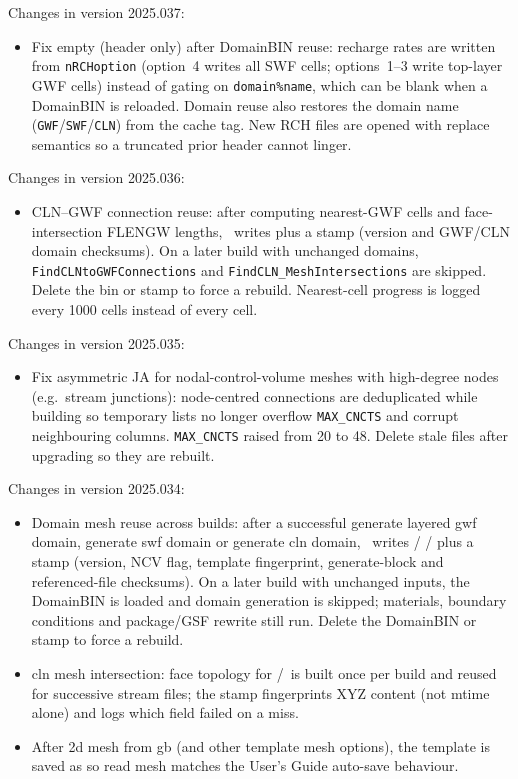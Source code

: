 \label{chapter:modifications}
\label{changes:2025.037}
Changes in version 2025.037:
\begin{itemize}
\item Fix empty  (header only) after DomainBIN reuse: recharge rates are written from \texttt{nRCHoption} (option~4 writes all SWF cells; options~1--3 write top-layer GWF cells) instead of gating on \texttt{domain\%name}, which can be blank when a DomainBIN is reloaded. Domain reuse also restores the domain name (\texttt{GWF}/\texttt{SWF}/\texttt{CLN}) from the cache tag. New RCH files are opened with replace semantics so a truncated prior header cannot linger.
\end{itemize}

\label{changes:2025.036}
Changes in version 2025.036:
\begin{itemize}
\item CLN--GWF connection reuse: after computing nearest-GWF cells and face-intersection FLENGW lengths, \mut\ writes  plus a  stamp (version and GWF/CLN domain checksums). On a later build with unchanged domains, \texttt{FindCLNtoGWFConnections} and \texttt{FindCLN\_MeshIntersections} are skipped. Delete the bin or stamp to force a rebuild. Nearest-cell progress is logged every 1000 cells instead of every cell.
\end{itemize}

\label{changes:2025.035}
Changes in version 2025.035:
\begin{itemize}
\item Fix asymmetric JA for nodal-control-volume meshes with high-degree nodes (e.g.\ stream junctions): node-centred connections are deduplicated while building so temporary lists no longer overflow \texttt{MAX\_CNCTS} and corrupt neighbouring columns. \texttt{MAX\_CNCTS} raised from 20 to 48. Delete stale  files after upgrading so they are rebuilt.
\end{itemize}

\label{changes:2025.034}
Changes in version 2025.034:
\begin{itemize}
\item Domain mesh reuse across builds: after a successful {\sf generate layered gwf domain}, {\sf generate swf domain} or {\sf generate cln domain}, \mut\ writes  /  /  plus a  stamp (version, NCV flag, template fingerprint, generate-block and referenced-file checksums). On a later build with unchanged inputs, the DomainBIN is loaded and domain generation is skipped; materials, boundary conditions and package/GSF rewrite still run. Delete the DomainBIN or stamp to force a rebuild.
\item {\sf cln mesh intersection}: face topology for \gwf/\swf\ is built once per build and reused for successive stream files; the  stamp fingerprints XYZ content (not mtime alone) and logs which field failed on a miss.
\item After {\sf 2d mesh from gb} (and other template mesh options), the template is saved as  so {\sf read mesh} matches the User's Guide auto-save behaviour.
\end{itemize}

